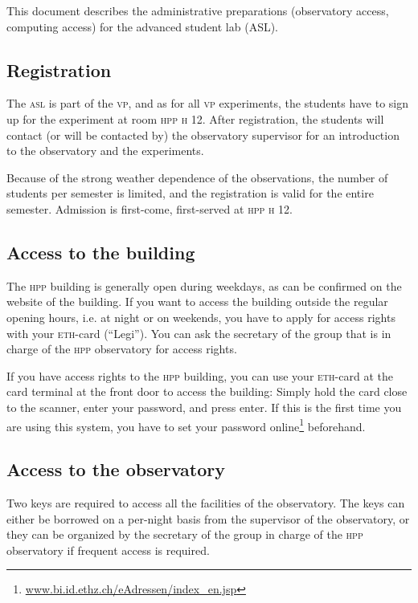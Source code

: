 \documentclass[a4paper, 11pt, fleqn]{memoir}
\begin{document}
This document describes the administrative preparations (observatory access, computing access) for the advanced student lab (ASL).

\subsection{Registration}
The \textsc{asl} is part of the \textsc{vp}, and as for all \textsc{vp} experiments, the students have to sign up for the experiment at room \textsc{hpp} \textsc{h} 12.
After registration, the students will contact (or will be contacted by) the observatory supervisor for an introduction to the observatory and the experiments.

Because of the strong weather dependence of the observations, the number of students per semester is limited, and the registration is valid for the entire semester.
Admission is first-come, first-served at \textsc{hpp} \textsc{h} 12.

\subsection{Access to the building}
The \textsc{hpp} building is generally open during weekdays, as can be confirmed on the website of the building.
If you want to access the building outside the regular opening hours, i.e. at night or on weekends, you have to apply for access rights with your \textsc{eth}-card (\enquote{Legi}).
You can ask the secretary of the group that is in charge of the \textsc{hpp} observatory for access rights.

If you have access rights to the \textsc{hpp} building, you can use your \textsc{eth}-card at the card terminal at the front door to access the building: Simply hold the card close to the scanner, enter your password, and press enter.
If this is the first time you are using this system, you have to set your password online\footnote{\url{www.bi.id.ethz.ch/eAdressen/index_en.jsp}} beforehand.

\subsection{Access to the observatory}
Two keys are required to access all the facilities of the observatory.
The keys can either be borrowed on a per-night basis from the supervisor of the observatory, or they can be organized by the secretary of the group in charge of the \textsc{hpp} observatory if frequent access is required.

\printbibliography
\end{document}

